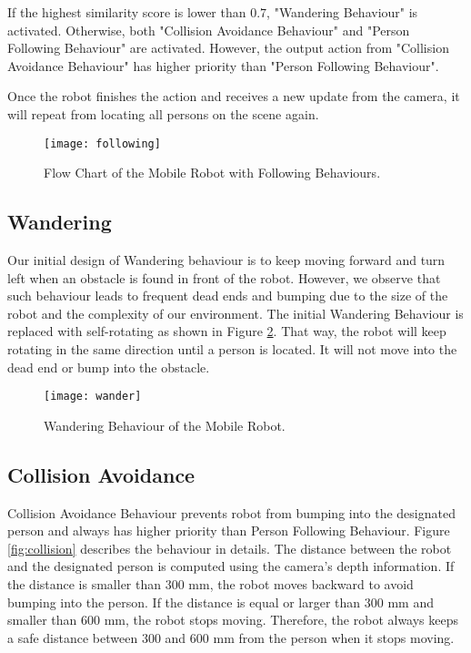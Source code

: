 If the highest similarity score is lower than $0.7$, "Wandering Behaviour" is activated.
Otherwise, both "Collision Avoidance Behaviour" and "Person Following Behaviour" are activated. However, the output action from "Collision Avoidance Behaviour" has higher priority than "Person Following Behaviour".

Once the robot finishes the action and receives a new update from the camera, it will repeat from locating all persons on the scene again.

\begin{figure}
\centering
\texttt{[image: following]}
\caption{Flow Chart of the Mobile Robot with Following Behaviours.}
\label{fig:following}
\end{figure}

\subsection{Wandering}
Our initial design of Wandering behaviour is to keep moving forward and turn left when an obstacle is found in front of the robot.
However, we observe that such behaviour leads to frequent dead ends and bumping due to the size of the robot and the complexity of our environment.
The initial Wandering Behaviour is replaced with self-rotating as shown in Figure \ref{fig:wander}.
That way, the robot will keep rotating in the same direction until a person is located.
It will not move into the dead end or bump into the obstacle.

\begin{figure}
\centering
\texttt{[image: wander]}
\caption{Wandering Behaviour of the Mobile Robot.}
\label{fig:wander}
\end{figure}



\subsection{Collision Avoidance}
Collision Avoidance Behaviour prevents robot from bumping into the designated person and always has higher priority than Person Following Behaviour.
Figure \ref{fig:collision} describes the behaviour in details. The distance between the robot and the designated person is computed using the camera's depth information.
If the distance is smaller than $300$ mm, the robot moves backward to avoid bumping into the person.
If the distance is equal or larger than $300$ mm and smaller than $600$ mm, the robot stops moving.
Therefore, the robot always keeps a safe distance between $300$ and $600$ mm from the person when it stops moving.

